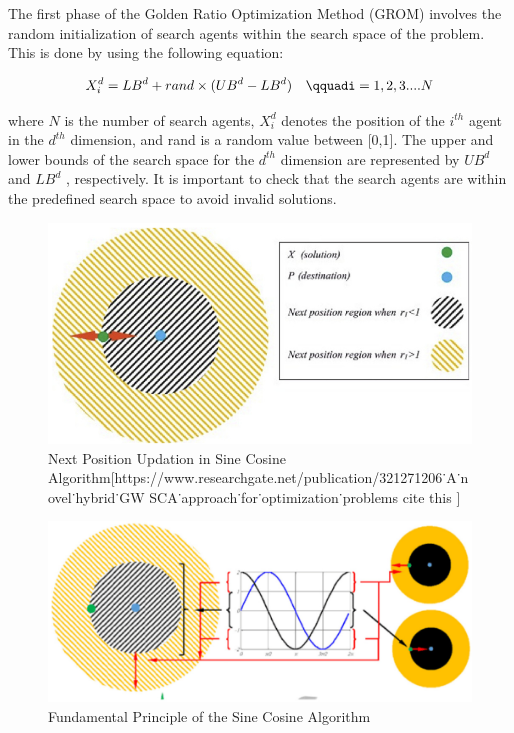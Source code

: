 The first phase of the Golden Ratio Optimization Method (GROM) involves the random initialization of search agents within the search space of the problem. This is done by using the following equation:

\begin{equation}
X_{i}^{d}=L B^{d}+r a n d\times(U B^{d}-L B^{d})\quad\qquadi=1,2,3....N
\end{equation}

where $N$ is the number of search agents, $X_{i}^{d}$ denotes the position of the $i^{t h}$ agent in the $d^{t h}$ dimension, and rand is a random value between [0,1]. The upper and lower bounds of the search space for the $d^{t h}$ dimension are represented by $U B^{d}$ and $L B^{d}$ , respectively. It is important to check that the search agents are within the predefined search space to avoid invalid solutions.

\begin{figure}[htbp]
\centering
\includegraphics[width=0.8\linewidth]{images/ba413f896fe56915813e40f2ffd5c19fe7ba2967ceb8effd230c84a9c98770ba.jpg}
\caption{Next Position Updation in Sine Cosine Algorithm[https://www.researchgate.net/publication/321271206˙A˙novel˙hybrid˙GW SCA˙approach˙for˙optimization˙problems cite this ]}
\label{fig:4}
\end{figure}


\begin{figure}[htbp]
\centering
\includegraphics[width=0.8\linewidth]{images/3032dc9c1f3de4483d6a84bfeb749db90d47bb550076bf97fbda76af5c2b6322.jpg}
\caption{Fundamental Principle of the Sine Cosine Algorithm}
\label{fig:5}
\end{figure}


